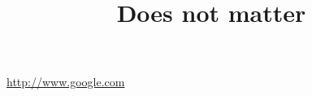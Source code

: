 \documentclass{IEEEtran}
\title{Does not matter}
\begin{document}
\url{http://www.google.com}
\end{document}
